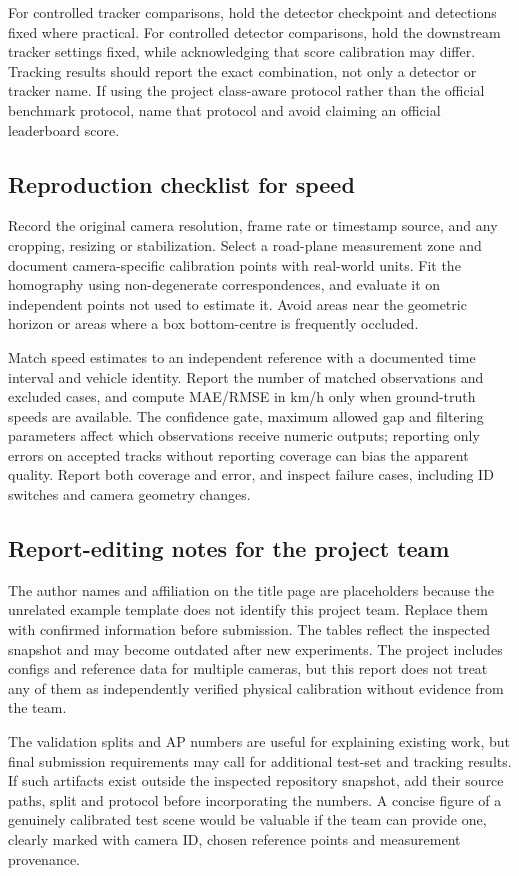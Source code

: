 For controlled tracker comparisons, hold the detector checkpoint and detections fixed where practical. For controlled detector comparisons, hold the downstream tracker settings fixed, while acknowledging that score calibration may differ. Tracking results should report the exact combination, not only a detector or tracker name. If using the project class-aware protocol rather than the official benchmark protocol, name that protocol and avoid claiming an official leaderboard score.

\subsection{Reproduction checklist for speed}
Record the original camera resolution, frame rate or timestamp source, and any cropping, resizing or stabilization. Select a road-plane measurement zone and document camera-specific calibration points with real-world units. Fit the homography using non-degenerate correspondences, and evaluate it on independent points not used to estimate it. Avoid areas near the geometric horizon or areas where a box bottom-centre is frequently occluded.

Match speed estimates to an independent reference with a documented time interval and vehicle identity. Report the number of matched observations and excluded cases, and compute MAE/RMSE in km/h only when ground-truth speeds are available. The confidence gate, maximum allowed gap and filtering parameters affect which observations receive numeric outputs; reporting only errors on accepted tracks without reporting coverage can bias the apparent quality. Report both coverage and error, and inspect failure cases, including ID switches and camera geometry changes.

\subsection{Report-editing notes for the project team}
The author names and affiliation on the title page are placeholders because the unrelated example template does not identify this project team. Replace them with confirmed information before submission. The tables reflect the inspected snapshot and may become outdated after new experiments. The project includes configs and reference data for multiple cameras, but this report does not treat any of them as independently verified physical calibration without evidence from the team.

The validation splits and AP numbers are useful for explaining existing work, but final submission requirements may call for additional test-set and tracking results. If such artifacts exist outside the inspected repository snapshot, add their source paths, split and protocol before incorporating the numbers. A concise figure of a genuinely calibrated test scene would be valuable if the team can provide one, clearly marked with camera ID, chosen reference points and measurement provenance.
